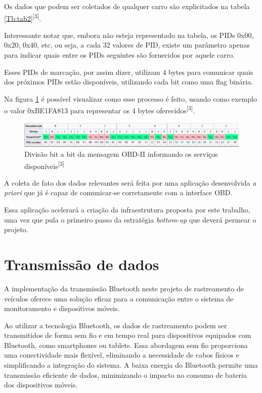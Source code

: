 Os dados que podem ser coletados de qualquer carro são explicitados na tabela \ref{Tb:tab2}\textsuperscript{[3]}.



Interessante notar que, embora não esteja representado na tabela, os PIDs 0x00, 0x20, 0x40, etc, ou seja, a cada 32 valores de PID, existe um parâmetro apenas para indicar quais entre os PIDs seguintes são fornecidos por aquele carro.

Esses PIDs de marcação, por assim dizer, utilizam 4 bytes para comunicar quais dos próximos PIDs estão disponíveis, utilizando cada bit como uma flag binária. 

Na figura \ref{fig:bitwise_obd2} é possível visualizar como esse processo é feito, usando como exemplo o valor 0xBE1FA813 para representar os 4 bytes oferecidos\textsuperscript{[3]}.

\begin{figure}[hp]
    \centering
    
    \includegraphics[scale=0.7]{figures/tabela_dados_disponiveis.png}
    
    \caption{Divisão bit a bit da mensagem OBD-II informando os serviços disponíveis\textsuperscript{[3]}}
    
    \label{fig:bitwise_obd2}
\end{figure}

A coleta de fato dos dados relevantes será feita por uma aplicação desenvolvida \textit{a priori} que já é capaz de comunicar-se corretamente com a interface OBD.

Essa aplicação acelerará a criação da infraestrutura proposta por este trabalho, uma vez que pula o primeiro passo da estratégia \textit{bottom-up} que deverá permear o projeto.

\section{Transmissão de dados}

A implementação da transmissão Bluetooth neste projeto de rastreamento de veículos oferece uma solução eficaz para a comunicação entre o sistema de monitoramento e dispositivos móveis. 

Ao utilizar a tecnologia Bluetooth, os dados de rastreamento podem ser transmitidos de forma sem fio e em tempo real para dispositivos equipados com Bluetooth, como smartphones ou tablets. Essa abordagem sem fio proporciona uma conectividade mais flexível, eliminando a necessidade de cabos físicos e simplificando a integração do sistema. A baixa energia do Bluetooth permite uma transmissão eficiente de dados, minimizando o impacto no consumo de bateria dos dispositivos móveis.

